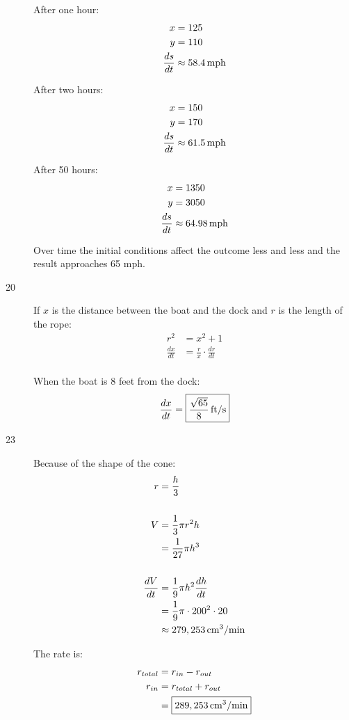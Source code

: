 \documentclass[letterpaper, landscape]{exam}
\begin{document}
\begin{description}
      After one hour:
      \begin{align*}
        x             & = 125 \\
        y             & = 110 \\
        \frac{ds}{dt} & \approx \unit[58.4]{mph}
      \end{align*}

      After two hours:
      \begin{align*}
        x             & = 150 \\
        y             & = 170 \\
        \frac{ds}{dt} & \approx \unit[61.5]{mph}
      \end{align*}

      After 50 hours:
      \begin{align*}
        x             & = 1350 \\
        y             & = 3050 \\
        \frac{ds}{dt} & \approx \unit[64.98]{mph}
      \end{align*}

      Over time the initial conditions affect the outcome less and less and the result approaches 
      65 mph.

    \item[20]
      If $x$ is the distance between the boat and the dock and $r$ is the length of the rope:
      \begin{align*}
        r^2           & = x^2 + 1 \\
        \frac{dx}{dt} & = \frac{r}{x} \cdot \frac{dr}{dt} \\
      \end{align*}

      When the boat is 8 feet from the dock:
      \[
        \frac{dx}{dt} = \boxed{ \unit[\frac{\sqrt{65}}{8}]{ft/s} }
      \]

    \item[23]
      Because of the shape of the cone:
      \begin{align*}
        r             & = \frac{h}{3} \\
        \\
        V             & = \frac{1}{3} \pi r^2 h \\
                      & = \frac{1}{27} \pi h^3 \\
        \\
        \frac{dV}{dt} & = \frac{1}{9} \pi h^2 \frac{dh}{dt} \\
                      & = \frac{1}{9} \pi \cdot 200^2 \cdot 20 \\
                      & \approx \unit[279,253]{cm^3/min}
      \end{align*}

      The rate is:
      \begin{align*}
        r_{total} & = r_{in} - r_{out} \\
        r_{in}    & = r_{total} + r_{out} \\
                  & = \boxed{ \unit[289,253]{cm^3/min} } \\
      \end{align*}
  \end{description}
\end{document}
